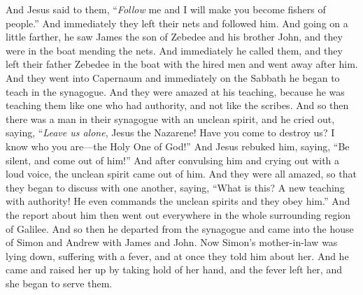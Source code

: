 \begin{biblechapter}
\verse And Jesus said to them, “\textit{Follow} me and I will make you become fishers of people.”
\verse And immediately they left their nets and followed him.
\verse And going on a little farther, he saw James the son of Zebedee and his brother John, and they were in the boat mending the nets.
\verse And immediately he called them, and they left their father Zebedee in the boat with the hired men and went away after him.
\verse And they went into Capernaum and immediately on the Sabbath he began to teach in the synagogue.
 And they were amazed at his teaching, because he was teaching them like one who had authority, and not like the scribes.
\verse And so then there was a man in their synagogue with an unclean spirit, and he cried out,
\verse saying, “\textit{Leave us alone}, Jesus the Nazarene! Have you come to destroy us? I know who you are—the Holy One of God!”
\verse And Jesus rebuked him, saying, “Be silent, and come out of him!”
\verse And after convulsing him and crying out with a loud voice, the unclean spirit came out of him.
\verse And they were all amazed, so that they began to discuss with one another, saying, “What is this? A new teaching with authority! He even commands the unclean spirits and they obey him.”
\verse And the report about him then went out everywhere in the whole surrounding region of Galilee.
 And so then he departed from the synagogue and came into the house of Simon and Andrew with James and John.
\verse Now Simon’s mother-in-law was lying down, suffering with a fever, and at once they told him about her.
\verse And he came and raised her up by taking hold of her hand, and the fever left her, and she began to serve them.

\end{biblechapter}

